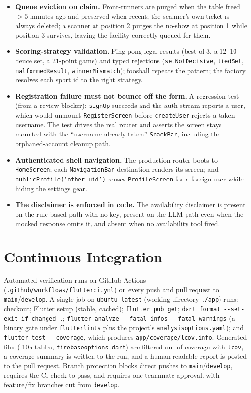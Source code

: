 \documentclass{configurations/polimi3i_thesis}
\renewcommand{\_}{\textunderscore\allowbreak}
\begin{document}
\begin{itemize}
    \item \textbf{Queue eviction on claim.} Front-runners are purged when the table freed $>5$ minutes ago and preserved when recent; the scanner's own ticket is always deleted; a scanner at position 2 purges the no-show at position 1 while position 3 survives, leaving the facility correctly queued for them.
    \item \textbf{Scoring-strategy validation.} Ping-pong legal results (best-of-3, a 12--10 deuce set, a 21-point game) and typed rejections (\texttt{setNotDecisive}, \texttt{tiedSet}, \texttt{malformedResult}, \texttt{winnerMismatch}); foosball repeats the pattern; the factory resolves each sport id to the right strategy.
    \item \textbf{Registration failure must not bounce off the form.} A regression test (from a review blocker): \texttt{signUp} succeeds and the auth stream reports a user, which would unmount \texttt{RegisterScreen} before \texttt{createUser} rejects a taken username. The test drives the real router and asserts the screen stays mounted with the ``username already taken'' \texttt{SnackBar}, including the orphaned-account cleanup path.
    \item \textbf{Authenticated shell navigation.} The production router boots to \texttt{HomeScreen}; each \texttt{NavigationBar} destination renders its screen; and \texttt{publicProfile('other-uid')} reuses \texttt{ProfileScreen} for a foreign user while hiding the settings gear.
    \item \textbf{The disclaimer is enforced in code.} The availability disclaimer is present on the rule-based path with no key, present on the LLM path even when the mocked response omits it, and absent when no availability tool fired.
\end{itemize}

\section{Continuous Integration}
Automated verification runs on GitHub Actions (\texttt{.github/workflows/flutter\_ci.yml}) on every push and pull request to \texttt{main}/\texttt{develop}. A single job on \texttt{ubuntu-latest} (working directory \texttt{./app}) runs: checkout; Flutter setup (stable, cached); \texttt{flutter pub get}; \texttt{dart format -{}-set-exit-if-changed .}; \texttt{flutter analyze -{}-fatal-infos -{}-fatal-warnings} (a binary gate under \texttt{flutter\_lints} plus the project's \texttt{analysis\_options.yaml}); and \texttt{flutter test -{}-coverage}, which produces \texttt{app/coverage/lcov.info}. Generated files (l10n tables, \texttt{firebase\_options.dart}) are filtered out of coverage with \texttt{lcov}, a coverage summary is written to the run, and a human-readable report is posted to the pull request. Branch protection blocks direct pushes to \texttt{main}/\texttt{develop}, requires the CI check to pass, and requires one teammate approval, with feature/fix branches cut from \texttt{develop}.
\end{document}

